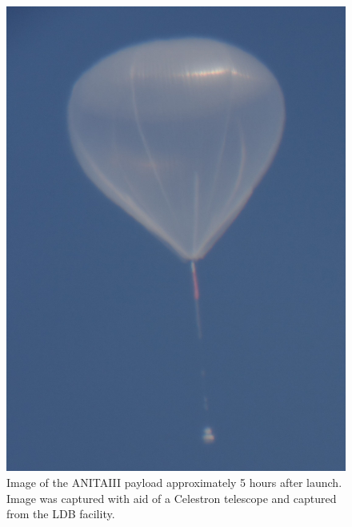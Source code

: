 		
\begin{figure}
\centering
	\includegraphics[height=0.9\textheight]{figures/CelestronBalloon}
	\caption{Image of the ANITAIII payload approximately 5 hours after launch. Image was captured with aid of a Celestron telescope and captured from the LDB facility. }
	\label{fig:Balloon}
\end{figure}

